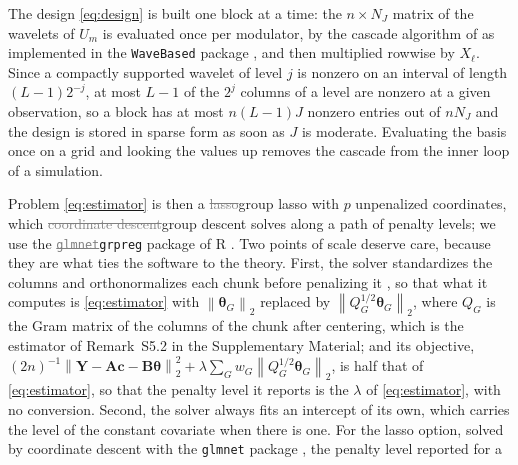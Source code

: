 \documentclass[12pt]{article} %
\theoremstyle{definition}
\theoremstyle{plain}
\newcommand{\norm}[1]{\left\lVert #1 \right\rVert}
\newcommand{\cv}{\ell}
\newcommand{\md}{m}
\newcommand{\lev}{j}
\newcommand{\NJ}{N_{J}}
\newcommand{\btheta}{\boldsymbol{\theta}}
\newcommand{\bc}{\mathbf{c}}
\newcommand{\pen}{\lambda}
\newcommand{\Amat}{\mathbf{A}}
\newcommand{\Bmat}{\mathbf{B}}
\newcommand{\bY}{\mathbf{Y}}
\begin{document}
The design \eqref{eq:design} is built one block at a time: the $n \times \NJ$
matrix of the wavelets of $U_{\md}$ is evaluated once per modulator, by the
cascade algorithm of \citet{Daubechies-Lagarias-1991} \textcolor{colR1}{as implemented in
the \texttt{WaveBased} package \citep{Montoril-WaveBased-2026}}, and then multiplied
rowwise by $X_{\cv}$. Since a compactly supported wavelet of level $\lev$ is
nonzero on an interval of length $(L-1)2^{-\lev}$, at most $L-1$ of the
$2^{\lev}$ columns of a level are nonzero at a given observation, so a block
has at most $n(L-1)J$ nonzero entries out of $n\NJ$ and the design is stored in
sparse form as soon as $J$ is moderate. Evaluating the basis once on a grid and
looking the values up removes the cascade from the inner loop of a
simulation.

Problem \eqref{eq:estimator} is then a \textcolor{gray}{\sout{lasso}}\textcolor{colR1}{group lasso} with $p$ unpenalized coordinates,
which \textcolor{gray}{\sout{coordinate descent}}\textcolor{colR1}{group descent \citep{Breheny-Huang-2015}} solves along a path of penalty levels; we use the
\textcolor{gray}{\sout{\texttt{glmnet}}}\textcolor{colR1}{\texttt{grpreg}} package\textcolor{gray}{\sout{ \mbox{\citep{friedman2010regularization}}}} \textcolor{colR1}{\citep{Breheny-Miller-grpreg-2026}} \textcolor{colR1}{of R
\citep{RCoreTeam-2026}}. Two points of scale deserve care, because they are
what ties the software to the theory. First, \textcolor{colR1}{the solver standardizes
the columns and orthonormalizes each chunk before penalizing it
\citep{Simon-Tibshirani-2012}, so that what
it computes is \eqref{eq:estimator} with $\norm{\btheta_{G}}_{2}$ replaced by
$\norm{Q_{G}^{1/2}\btheta_{G}}_{2}$, where $Q_{G}$ is the Gram matrix of the
columns of the chunk after centering, which is the estimator of Remark~S5.2 in
the Supplementary Material; and its objective,
$(2n)^{-1}\norm{\bY - \Amat\bc - \Bmat\btheta}_{2}^{2} +
\pen\sum_{G}w_{G}\norm{Q_{G}^{1/2}\btheta_{G}}_{2}$, is half that of
\eqref{eq:estimator}, so that the penalty level it reports is the $\pen$ of
\eqref{eq:estimator}, with no conversion. Second, the solver always fits an
intercept of its own, which carries the level of the constant covariate when
there is one. For the lasso option, solved by coordinate descent with the
\texttt{glmnet} package \citep{friedman2010regularization},} the penalty level reported for a
\end{document}
